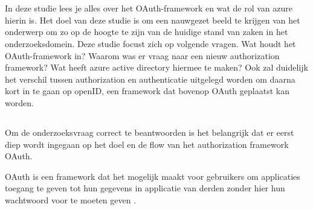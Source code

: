\chapter{}
\label{ch:stand-van-zaken}



In deze studie lees je alles over het OAuth-framework en wat de rol van azure hierin is. Het doel van deze studie is om een nauwgezet beeld te krijgen van het onderwerp om zo op de hoogte te zijn van de huidige stand van zaken in het onderzoeksdomein. Deze studie focust zich op volgende vragen. Wat houdt het OAuth-framework in? Waarom was er vraag naar een nieuw authorization framework? Wat heeft azure active directory hiermee te maken? Ook zal duidelijk het verschil tussen authorization en authenticatie uitgelegd worden om daarna kort in te gaan op openID, een framework dat bovenop OAuth geplaatst kan worden.
\section{}
\label{sec:OAuthFramework}
Om de onderzoeksvraag correct te beantwoorden is het belangrijk dat er eerst diep wordt ingegaan op het doel en de flow van het authorization framework OAuth.

OAuth is een framework dat het mogelijk maakt voor gebruikers om applicaties toegang te geven tot hun gegevens in applicatie van derden zonder hier hun wachtwoord voor te moeten geven \autocite{Deniss2016}.

